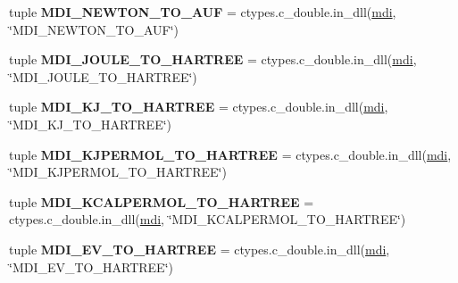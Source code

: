 \begin{DoxyCompactItemize}
\item 
\hypertarget{namespacemolssi__driver__interface_1_1mdi_a0898e7e5c47d8dc21ae38b29c10f5827}{tuple {\bfseries M\-D\-I\-\_\-\-N\-E\-W\-T\-O\-N\-\_\-\-T\-O\-\_\-\-A\-U\-F} = ctypes.\-c\-\_\-double.\-in\-\_\-dll(\hyperlink{classmdi}{mdi}, \char`\"{}M\-D\-I\-\_\-\-N\-E\-W\-T\-O\-N\-\_\-\-T\-O\-\_\-\-A\-U\-F\char`\"{})}\label{namespacemolssi__driver__interface_1_1mdi_a0898e7e5c47d8dc21ae38b29c10f5827}

\item 
\hypertarget{namespacemolssi__driver__interface_1_1mdi_a1bae6adb6f6eaaae9ad87cdfa47f337d}{tuple {\bfseries M\-D\-I\-\_\-\-J\-O\-U\-L\-E\-\_\-\-T\-O\-\_\-\-H\-A\-R\-T\-R\-E\-E} = ctypes.\-c\-\_\-double.\-in\-\_\-dll(\hyperlink{classmdi}{mdi}, \char`\"{}M\-D\-I\-\_\-\-J\-O\-U\-L\-E\-\_\-\-T\-O\-\_\-\-H\-A\-R\-T\-R\-E\-E\char`\"{})}\label{namespacemolssi__driver__interface_1_1mdi_a1bae6adb6f6eaaae9ad87cdfa47f337d}

\item 
\hypertarget{namespacemolssi__driver__interface_1_1mdi_a446e20f10967433ccf12ea80f32d41a0}{tuple {\bfseries M\-D\-I\-\_\-\-K\-J\-\_\-\-T\-O\-\_\-\-H\-A\-R\-T\-R\-E\-E} = ctypes.\-c\-\_\-double.\-in\-\_\-dll(\hyperlink{classmdi}{mdi}, \char`\"{}M\-D\-I\-\_\-\-K\-J\-\_\-\-T\-O\-\_\-\-H\-A\-R\-T\-R\-E\-E\char`\"{})}\label{namespacemolssi__driver__interface_1_1mdi_a446e20f10967433ccf12ea80f32d41a0}

\item 
\hypertarget{namespacemolssi__driver__interface_1_1mdi_a3937ae9828af2f61a47a184f84ee095d}{tuple {\bfseries M\-D\-I\-\_\-\-K\-J\-P\-E\-R\-M\-O\-L\-\_\-\-T\-O\-\_\-\-H\-A\-R\-T\-R\-E\-E} = ctypes.\-c\-\_\-double.\-in\-\_\-dll(\hyperlink{classmdi}{mdi}, \char`\"{}M\-D\-I\-\_\-\-K\-J\-P\-E\-R\-M\-O\-L\-\_\-\-T\-O\-\_\-\-H\-A\-R\-T\-R\-E\-E\char`\"{})}\label{namespacemolssi__driver__interface_1_1mdi_a3937ae9828af2f61a47a184f84ee095d}

\item 
\hypertarget{namespacemolssi__driver__interface_1_1mdi_a1179ce5d81a422949e186263ac4cb6c7}{tuple {\bfseries M\-D\-I\-\_\-\-K\-C\-A\-L\-P\-E\-R\-M\-O\-L\-\_\-\-T\-O\-\_\-\-H\-A\-R\-T\-R\-E\-E} = ctypes.\-c\-\_\-double.\-in\-\_\-dll(\hyperlink{classmdi}{mdi}, \char`\"{}M\-D\-I\-\_\-\-K\-C\-A\-L\-P\-E\-R\-M\-O\-L\-\_\-\-T\-O\-\_\-\-H\-A\-R\-T\-R\-E\-E\char`\"{})}\label{namespacemolssi__driver__interface_1_1mdi_a1179ce5d81a422949e186263ac4cb6c7}

\item 
\hypertarget{namespacemolssi__driver__interface_1_1mdi_ac13177eae2f4a37d788d8e1442b340dd}{tuple {\bfseries M\-D\-I\-\_\-\-E\-V\-\_\-\-T\-O\-\_\-\-H\-A\-R\-T\-R\-E\-E} = ctypes.\-c\-\_\-double.\-in\-\_\-dll(\hyperlink{classmdi}{mdi}, \char`\"{}M\-D\-I\-\_\-\-E\-V\-\_\-\-T\-O\-\_\-\-H\-A\-R\-T\-R\-E\-E\char`\"{})}\label{namespacemolssi__driver__interface_1_1mdi_ac13177eae2f4a37d788d8e1442b340dd}


\end{DoxyCompactItemize}
